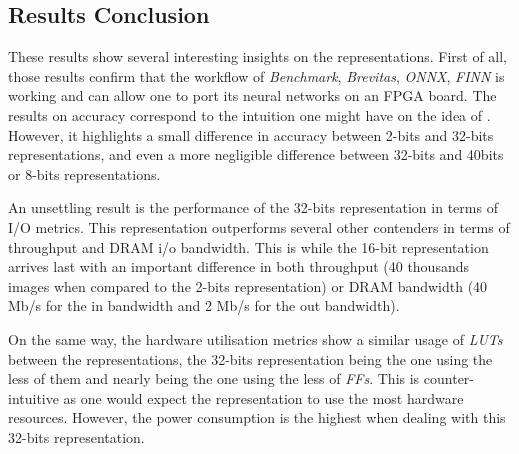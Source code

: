 
\subsection{Results Conclusion}

These results show several interesting insights on the representations. First of all, those results confirm that the workflow of \emph{Benchmark}, \emph{Brevitas}, \emph{ONNX}, \emph{FINN} is working and can allow one to port its neural networks on an FPGA board. The results on accuracy correspond to the intuition one might have on the idea of . However, it highlights a small difference in accuracy between 2-bits and 32-bits representations, and even a more negligible difference between 32-bits and 40bits or 8-bits representations.

An unsettling result is the performance of the 32-bits representation in terms of I/O metrics. This representation outperforms several other contenders in terms of throughput and DRAM i/o bandwidth. This is while the 16-bit representation arrives last with an important difference in both throughput (40 thousands images when compared to the 2-bits representation) or DRAM bandwidth (40 Mb/s for the in bandwidth and 2 Mb/s for the out bandwidth).

On the same way, the hardware utilisation metrics show a similar usage of \emph{LUTs} between the representations, the 32-bits representation being the one using the less of them and nearly being the one using the less of \emph{FFs}. This is counter-intuitive as one would expect the  representation to use the most hardware resources. However, the power consumption is the highest when dealing with this 32-bits representation.
